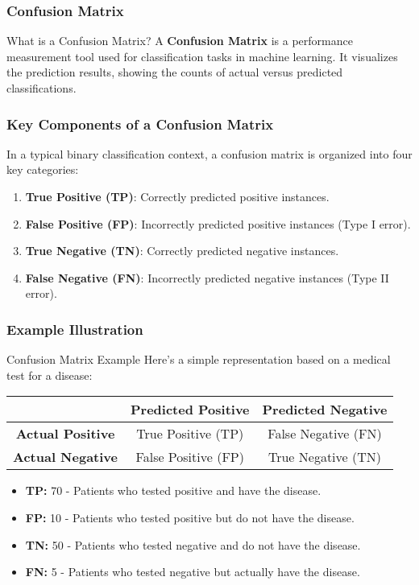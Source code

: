 \documentclass[aspectratio=169]{beamer}
\begin{document}
\begin{frame}[fragile]
    \frametitle{Confusion Matrix}
    \begin{block}{What is a Confusion Matrix?}
        A \textbf{Confusion Matrix} is a performance measurement tool used for 
        classification tasks in machine learning. It visualizes the prediction 
        results, showing the counts of actual versus predicted classifications.
    \end{block}
\end{frame}

\begin{frame}[fragile]
    \frametitle{Key Components of a Confusion Matrix}
    In a typical binary classification context, a confusion matrix is organized into four key categories:
    \begin{enumerate}
        \item \textbf{True Positive (TP)}: Correctly predicted positive instances.
        \item \textbf{False Positive (FP)}: Incorrectly predicted positive instances (Type I error).
        \item \textbf{True Negative (TN)}: Correctly predicted negative instances.
        \item \textbf{False Negative (FN)}: Incorrectly predicted negative instances (Type II error).
    \end{enumerate}
\end{frame}

\begin{frame}[fragile]
    \frametitle{Example Illustration}
    \begin{block}{Confusion Matrix Example}
        Here’s a simple representation based on a medical test for a disease:
        \begin{center}
            \begin{tabular}{|c|c|c|}
                \hline
                & \textbf{Predicted Positive} & \textbf{Predicted Negative} \\
                \hline
                \textbf{Actual Positive} & True Positive (TP) & False Negative (FN) \\
                \hline
                \textbf{Actual Negative} & False Positive (FP) & True Negative (TN) \\
                \hline
            \end{tabular}
        \end{center}
        \begin{itemize}
            \item \textbf{TP:} 70 - Patients who tested positive and have the disease.
            \item \textbf{FP:} 10 - Patients who tested positive but do not have the disease.
            \item \textbf{TN:} 50 - Patients who tested negative and do not have the disease.
            \item \textbf{FN:} 5 - Patients who tested negative but actually have the disease.
        \end{itemize}
    \end{block}
\end{frame}
\end{document}
